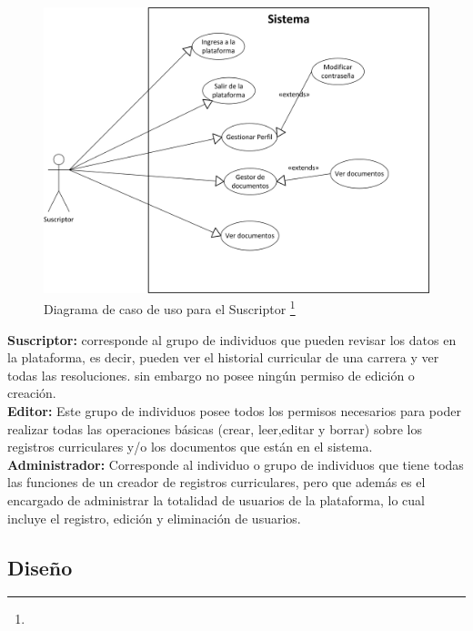 	\begin{figure}[H]
		\centering
		\includegraphics[width=1\textwidth]{images/Capitulo_3/caso_uso_Suscriptor.png}
		\caption[Diagrama de caso de uso para el Suscriptor]{Diagrama de caso de uso para el Suscriptor \footnote{}}
		\label{caso_uso_Suscriptor}
	\end{figure}
	
	 \label{usuarios_Sistema}
	
	
	\textbf{Suscriptor:} corresponde al grupo de individuos que pueden revisar los datos en la plataforma, es decir, pueden ver el historial curricular de una carrera y ver todas las resoluciones. sin embargo no posee ningún permiso de edición o creación.
	\\
	
	\textbf{Editor:} Este grupo de individuos posee todos los permisos necesarios para poder realizar todas las operaciones básicas (crear, leer,editar y borrar) sobre los registros curriculares y/o los documentos que están en el sistema.
	\\
	
	\textbf{Administrador:} Corresponde al individuo o grupo de individuos que tiene todas las
	funciones de un creador de registros curriculares, pero que además es el encargado de administrar la
	totalidad de usuarios de la plataforma, lo cual incluye el registro, edición y eliminación
	de usuarios.
	
	
	
\subsection{Diseño}


